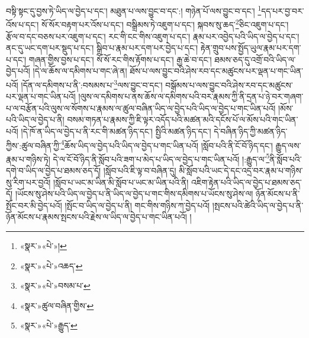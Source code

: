 བསྟི་སྟང་དུ་བྱས་ཏེ་ཡིད་ལ་བྱེད་པ་དང་། མཐུན་པ་ལས་བྱུང་བ་དང་:། གཉེན་པོ་ལས་བྱུང་བ་དང་། \footnote{«སྣར་»«པེ་»།  }དད་པར་བྱ་བར་འོས་པ་དང་། སོ་སོར་བརྟག་པར་འོས་པ་དང་། བསྒྲིམས་ཏེ་འཇུག་པ་དང་། སྐབས་སུ་ཆད་\footnote{«སྣར་»«པེ་»འཆད་}ཅིང་འཇུག་པ་དང་། རྩོལ་བ་དང་བཅས་པར་འཇུག་པ་དང་། རང་གི་ངང་གིས་འཇུག་པ་དང་། རྣམ་པར་འབྱེད་པའི་ཡིད་ལ་བྱེད་པ་དང་། ནང་དུ་ཡང་དག་པར་སྡུད་པ་དང་། སྒྲིབ་པ་རྣམ་པར་དག་པར་བྱེད་པ་དང་། རྟེན་གྲུབ་པས་སྤྱོད་ཡུལ་རྣམ་པར་དག་པ་དང་། གཞན་གྱིས་བྱས་པ་དང་། སོ་སོ་རང་གིས་རྟོགས་པ་དང་། རྒྱ་ཆེ་བ་དང་། ཐམས་ཅད་དུ་འགྲོ་བའི་ཡིད་ལ་བྱེད་པའོ། །དེ་ལ་ཆོས་ལ་དམིགས་པ་གང་ཞེ་ན། ཐོས་པ་ལས་བྱུང་བའི་ཤེས་རབ་དང་མཚུངས་པར་ལྡན་པ་གང་ཡིན་པའོ། །དོན་ལ་དམིགས་པ་ནི་:བསམས་པ་\footnote{«སྣར་»«པེ་»བསམ་པ་}ལས་བྱུང་བ་དང་། བསྒོམས་པ་ལས་བྱུང་བའི་ཤེས་རབ་དང་མཚུངས་པར་ལྡན་པ་གང་ཡིན་པའོ། །ལུས་ལ་དམིགས་པ་ནས་ཆོས་ལ་དམིགས་པའི་བར་རྣམས་ཀྱི་ནི་དྲན་པ་ཉེ་བར་གཞག་པ་ལ་བརྩོན་པའི་ལུས་ལ་སོགས་པ་རྣམས་ལ་ཚུལ་བཞིན་ཡིད་ལ་བྱེད་པའི་ཡིད་ལ་བྱེད་པ་གང་ཡིན་པའོ། །མོས་པའི་ཡིད་ལ་བྱེད་པ་ནི། བསམ་གཏན་པ་རྣམས་ཀྱི་ཇི་ལྟར་འདོད་པའི་མཚན་མའི་དངོས་པོ་ལ་མོས་པའི་གང་ཡིན་པའོ། །དེ་ཁོ་ན་ཡིད་ལ་བྱེད་པ་ནི་རང་གི་མཚན་ཉིད་དང་། སྤྱིའི་མཚན་ཉིད་དང་། དེ་བཞིན་ཉིད་ཀྱི་མཚན་ཉིད་ཀྱིས་:ཚུལ་བཞིན་ཀྱི་\footnote{«སྣར་»ཚུལ་བཞིན་གྱིས་}ཆོས་ཡིད་ལ་བྱེད་པའི་ཡིད་ལ་བྱེད་པ་གང་ཡིན་པའོ། །སློབ་པའི་ནི་ངོ་བོ་ཉིད་དང་། རྒྱུད་ལས་རྣམ་པ་གཉིས་ཏེ། དེ་ལ་ངོ་བོ་ཉིད་ནི་སློབ་པའི་ཟག་པ་མེད་པ་ཡིད་ལ་བྱེད་པ་གང་ཡིན་པའོ། །:རྒྱུད་ལ་\footnote{«སྣར་»«པེ་»རྒྱུད་}ནི་སློབ་པའི་དགེ་བ་ཡིད་ལ་བྱེད་པ་ཐམས་ཅད་དོ། །སློབ་པའི་ཇི་ལྟ་བ་བཞིན་དུ། མི་སློབ་པའི་ཡང་དེ་དང་འདྲ་བར་རྣམ་པ་གཉིས་སུ་རིག་པར་བྱའོ། །སློབ་པ་ཡང་མ་ཡིན་མི་སློབ་པ་ཡང་མ་ཡིན་པའི་ནི། འཇིག་རྟེན་པའི་ཡིད་ལ་བྱེད་པ་ཐམས་ཅད་དོ། །ཡོངས་སུ་ཤེས་པའི་ཡིད་ལ་བྱེད་པ་ནི་ཡིད་ལ་བྱེད་པ་གང་གིས་དམིགས་པ་ཡོངས་སུ་ཤེས་ལ། ཉོན་མོངས་པ་ནི་སྤོང་བར་མི་བྱེད་པའོ། །སྤོང་བ་ཡིད་ལ་བྱེད་པ་ནི། གང་གིས་གཉིས་ཀ་བྱེད་པའོ། །སྤངས་པའི་ཚེའི་ཡིད་ལ་བྱེད་པ་ནི་ཉོན་མོངས་པ་རྣམས་སྤངས་པའི་རྗེས་ལ་ཡིད་ལ་བྱེད་པ་གང་ཡིན་པའོ། །

